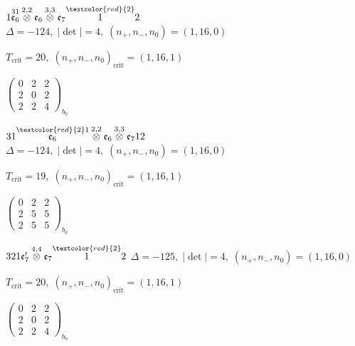 \documentclass[10pt]{article}
\begin{document}
\smallskip

$1\overset{31}{\mathfrak{e}_6}\overset{2,2}{\otimes}\mathfrak{e}_6\overset{3,3}{\otimes}\mathfrak{e}_7\overset{\textcolor{red}{2}}{1}2$ \quad $\Delta=-124,\; |\det|=4,\; (n_+,n_-,n_0)=(1,16,0)$

\hspace{1em}$T_{\text{crit}}=20,\; (n_+,n_-,n_0)_{\text{crit}}=(1,16,1)$

\hspace{2em}$\left(\begin{smallmatrix}0 & 2 & 2 \\ 2 & 0 & 2 \\ 2 & 2 & 4\end{smallmatrix}\right)_{\!b_0}$

$31\overset{\textcolor{red}{2}1}{\mathfrak{e}_6}\overset{2,2}{\otimes}\mathfrak{e}_6\overset{3,3}{\otimes}\mathfrak{e}_712$ \quad $\Delta=-124,\; |\det|=4,\; (n_+,n_-,n_0)=(1,16,0)$

\hspace{1em}$T_{\text{crit}}=19,\; (n_+,n_-,n_0)_{\text{crit}}=(1,16,1)$

\hspace{2em}$\left(\begin{smallmatrix}0 & 2 & 2 \\ 2 & 5 & 5 \\ 2 & 5 & 5\end{smallmatrix}\right)_{\!b_0}$

\smallskip

$321\mathfrak{e}_7'\overset{4,4}{\otimes}\mathfrak{e}_7\overset{\textcolor{red}{2}}{1}2$ \quad $\Delta=-125,\; |\det|=4,\; (n_+,n_-,n_0)=(1,16,0)$

\hspace{1em}$T_{\text{crit}}=20,\; (n_+,n_-,n_0)_{\text{crit}}=(1,16,1)$

\hspace{2em}$\left(\begin{smallmatrix}0 & 2 & 2 \\ 2 & 0 & 2 \\ 2 & 2 & 4\end{smallmatrix}\right)_{\!b_0}$

\smallskip
\end{document}
